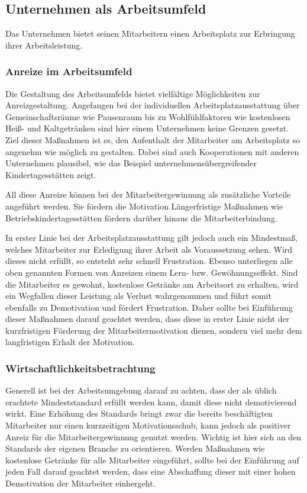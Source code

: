 \subsection{Unternehmen als Arbeitsumfeld}
Das Unternehmen bietet seinen Mitarbeitern einen Arbeitsplatz zur Erbringung ihrer Arbeitsleistung. 

\subsubsection{Anreize im Arbeitsumfeld}
Die Gestaltung des Arbeitsumfelds bietet vielfältige Möglichkeiten zur Anreizgestaltung. Angefangen bei der individuellen Arbeitsplatzausstattung über Gemeinschaftsräume wie Pausenraum bis zu Wohlfühlfaktoren wie kostenlosen Heiß- und Kaltgetränken sind hier einem Unternehmen keine Grenzen gesetzt. Ziel dieser Maßnahmen ist es, den Aufenthalt der Mitarbeiter am Arbeitsplatz so angenehm wie möglich zu gestalten. Dabei sind auch Kooperationen mit anderen Unternehmen plausibel, wie das Beispiel unternehmensübergreifender Kindertagesstätten zeigt. 

All diese Anreize können bei der Mitarbeitergewinnung als zusätzliche Vorteile angeführt werden. Sie fördern die Motivation  Längerfristige Maßnahmen wie Betriebskindertagesstätten fördern darüber hinaus die Mitarbeiterbindung. 

In erster Linie bei der Arbeitsplatzausstattung gilt jedoch auch ein Mindestmaß, welches Mitarbeiter zur Erledigung ihrer Arbeit als Voraussetzung sehen. Wird dieses nicht erfüllt, so entsteht sehr schnell Frustration. Ebenso unterliegen alle oben genannten Formen von Anreizen einem Lern- bzw. Gewöhnungseffekt. Sind die Mitarbeiter es gewohnt, kostenlose Getränke am Arbeitsort zu erhalten, wird ein Wegfallen dieser Leistung als Verlust wahrgenommen und führt somit ebenfalls zu Demotivation und fördert Frustration. Daher sollte bei Einführung dieser Maßnahmen darauf geachtet werden, dass diese in erster Linie nicht der kurzfristigen Förderung der Mitarbeitermotivation dienen, sondern viel mehr dem langfristigen Erhalt der Motivation.

\subsubsection{Wirtschaftlichkeitsbetrachtung}
Generell ist bei der Arbeitsumgebung darauf zu achten, dass der als üblich erachtete Mindeststandard erfüllt werden kann, damit diese nicht demotivierend wirkt. Eine Erhöhung des Standards bringt zwar die bereits beschäftigten Mitarbeiter nur einen kurzzeitigen Motivationsschub, kann jedoch als positiver Anreiz für die Mitarbeitergewinnung genutzt werden. Wichtig ist hier sich an den Standards der eigenen Branche zu orientieren. Werden Maßnahmen wie kostenlose Getränke für alle Mitarbeiter eingeführt, sollte bei der Einführung auf jeden Fall darauf geachtet werden, dass eine Abschaffung dieser mit einer hohen Demotivation der Mitarbeiter einhergeht.
\newpage